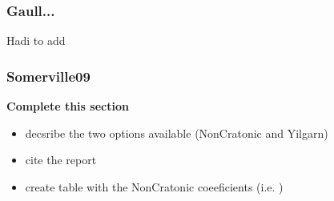 \subsubsection{Gaull...}
Hadi to add

\subsubsection{Somerville09} \textbf{Complete this section}
\begin{itemize}
\item decsribe the two options available (NonCratonic and Yilgarn)
\item cite the report
\item create table with the NonCratonic coeeficients (i.e.
)
\end{itemize}

